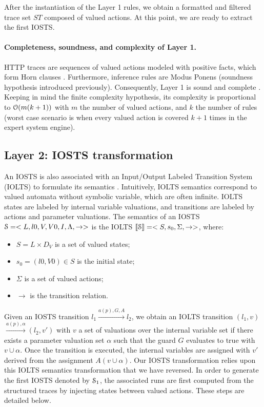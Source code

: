 After the instantiation of the Layer 1 rules, we obtain a
formatted and filtered trace set $ST$ composed of valued actions.
At this point, we are ready to extract the first IOSTS.

\paragraph{Completeness, soundness, and complexity of Layer 1.}
HTTP traces are sequences of valued actions modeled with positive
facts, which form Horn clauses \cite{JSL:9106942}.  Furthermore,
inference rules are Modus Ponens (soundness hypothesis introduced
previously).  Consequently, Layer 1 is sound and complete
\cite{logicreasoning}.  Keeping in mind the finite complexity
hypothesis, its complexity is proportional to
$\EuScript{O}(m(k+1))$ with $m$ the number of valued actions, and
$k$ the number of rules (worst case scenario is when every valued
action is covered $k+1$ times in the expert system engine).

\subsection{Layer 2: IOSTS transformation}
\label{sec:modelinf:webapps:L2}

An IOSTS is also associated with an Input/Output Labeled
Transition System (IOLTS) to formulate its semantics
\cite{rusu2005automatic,FTW05,FTW06}.  Intuitively, IOLTS
semantics correspond to valued automata without symbolic
variable, which are often infinite. IOLTS states are labeled by
internal variable valuations, and transitions are labeled by
actions and parameter valuations. The semantics of an IOSTS
$\EuScript{S}=<L,l0,V,V0,I,\Lambda,\rightarrow>$ is the IOLTS
$\llbracket \EuScript{S}\rrbracket = <S,s_0,\Sigma,\rightarrow>$,
where:

\begin{itemize}
    \item $S = L \times D_V$ is a set of valued states;

    \item $s_0=(l0,V0) \in S$ is the initial state;

    \item $\Sigma$ is a set of valued actions;

    \item $\rightarrow$ is the transition relation.
\end{itemize}

Given an IOSTS transition $l_1 \xrightarrow{a(p),G,A}l_2$, we
obtain an IOLTS transition $(l_1,v)$ $\xrightarrow{a(p),\alpha}
(l_2,v')$ with $v$ a set of valuations over the internal variable
set if there exists a parameter valuation set $\alpha$ such that
the guard $G$ evaluates to true with $v \cup \alpha$. Once the
transition is executed, the internal variables are assigned with
$v'$ derived from the assignment $A(v \cup \alpha)$.
Our IOSTS transformation relies upon this IOLTS semantics
transformation that we have reversed.  In order to generate the
first IOSTS denoted by $\EuScript{S}_1$, the associated runs are
first computed from the structured traces by injecting states
between valued actions. These steps are detailed below.

